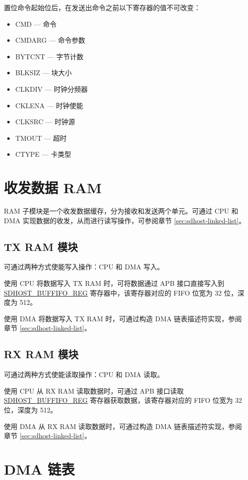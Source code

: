 \documentclass[main\_\_CN.tex]{subfiles}
\begin{document}
置位命令起始位后，在发送出命令之前以下寄存器的值不可改变：

\begin{itemize}
	\item CMD --- 命令
	\item CMDARG --- 命令参数
	\item BYTCNT --- 字节计数
	\item BLKSIZ --- 块大小
	\item CLKDIV --- 时钟分频器
	\item CKLENA --- 时钟使能
	\item CLKSRC --- 时钟源
	\item TMOUT --- 超时
	\item CTYPE --- 卡类型
\end{itemize}

\section{收发数据 RAM}
RAM 子模块是一个收发数据缓存，分为接收和发送两个单元。可通过 CPU 和 DMA 实现数据的收发，从而进行读写操作，可参阅章节 \ref{sec:sdhost-linked-list}。

\subsection{TX RAM 模块}
可通过两种方式使能写入操作：CPU 和 DMA 写入。

使用 CPU 将数据写入 TX RAM 时，可将数据通过 APB 接口直接写入到 \hyperref[fielddesc:SDHOSTBUFFIFOREG]{\hyperref[regdesc:SDHOSTBUFFIFOREG]{SDHOST\_BUFFIFO\_REG}} 寄存器中，该寄存器对应的 FIFO 位宽为 32 位，深度为 512。

使用 DMA 将数据写入 TX RAM 时，可通过构造 DMA 链表描述符实现，参阅章节 \ref{sec:sdhost-linked-list}。

\subsection{RX RAM 模块}
可通过两种方式使能读取操作：CPU 和 DMA 读取。

使用 CPU 从 RX RAM 读取数据时，可通过 APB 接口读取 \hyperref[fielddesc:SDHOSTBUFFIFOREG]{\hyperref[regdesc:SDHOSTBUFFIFOREG]{SDHOST\_BUFFIFO\_REG}} 寄存器获取数据，该寄存器对应的 FIFO 位宽为 32 位，深度为 512。

使用 DMA 从 RX RAM 读取数据时，可通过构造 DMA 链表描述符实现，参阅章节 \ref{sec:sdhost-linked-list}。


\section{DMA 链表}
\end{document}
